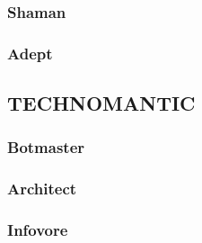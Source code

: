 \documentclass[oneside,10pt]{article}
\begin{document}
\begin{multicols}{2}
\subsubsection{Shaman}

\subsubsection{Adept}

\subsection{TECHNOMANTIC}

\subsubsection{Botmaster}

\subsubsection{Architect}

\subsubsection{Infovore}


\end{multicols}

\newpage
{}
\end{document}
